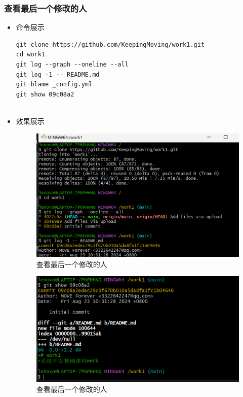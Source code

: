\documentclass[UTF8]{ctexart}
\begin{document}
\subsubsection{查看最后一个修改的人}
\begin{itemize}
  \item 命令展示
  \begin{verbatim}
git clone https://github.com/KeepingMoving/work1.git
cd work1
git log --graph --oneline --all
git log -1 -- README.md
git blame _config.yml
git show 09c08a2


  \end{verbatim}

  \item 效果展示
  \begin{figure}[H]
    \centering
    \includegraphics[width=\textwidth]{n7} %
    \caption{查看最后一个修改的人}
    \label{fig:remote-branch-check}
  \end{figure}
\begin{figure}[H]
    \centering
    \includegraphics[width=\textwidth]{n8} %
    \caption{查看最后一个修改的人}
    \label{fig:remote-branch-check}
  \end{figure}

\end{itemize}
\end{document}
